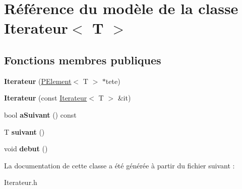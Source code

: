 \hypertarget{class_iterateur}{}\section{Référence du modèle de la classe Iterateur$<$ T $>$}
\label{class_iterateur}
\subsection*{Fonctions membres publiques}
\begin{DoxyCompactItemize}
\item 
\mbox{\label{class_iterateur_afe239cb16f4e9c0656c38ff0f721063a}} 
{\bfseries Iterateur} (\mbox{\hyperlink{class_p_element}{P\+Element}}$<$ T $>$ $\ast$tete)
\item 
\mbox{\label{class_iterateur_a364ad797d1c05c9191c06bc36ff2270e}} 
{\bfseries Iterateur} (const \mbox{\hyperlink{class_iterateur}{Iterateur}}$<$ T $>$ \&it)
\item 
\mbox{\label{class_iterateur_a35519ba11921986a2e49adea7dbcf4a7}} 
bool {\bfseries a\+Suivant} () const
\item 
\mbox{\label{class_iterateur_a4f3a19e2822a5e7e19d835492b4dbafc}} 
T {\bfseries suivant} ()
\item 
\mbox{\label{class_iterateur_a566ec911403a28c5f05e4e54b5a6b950}} 
void {\bfseries debut} ()
\end{DoxyCompactItemize}


La documentation de cette classe a été générée à partir du fichier suivant \+:\begin{DoxyCompactItemize}
\item 
Iterateur.\+h\end{DoxyCompactItemize}
